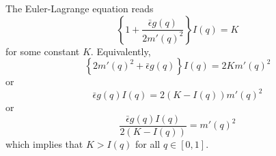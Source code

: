\documentclass[12pt]{article}
\begin{document}
The Euler-Lagrange equation reads
\begin{equation*}
\left\{1+\frac{\bar{\epsilon}g(q)}{2m'(q)^2}\right\}I(q)=K
\end{equation*}
for some constant $K$. Equivalently,
\begin{equation*}
\left\{2m'(q)^2+\bar{\epsilon}g(q)\right\}I(q)=2Km'(q)^2
\end{equation*}
or
\begin{equation*}
\bar{\epsilon}g(q)I(q)=2(K-I(q))m'(q)^2
\end{equation*}
or
\begin{equation*}
\frac{\bar{\epsilon}g(q)I(q)}{2(K-I(q))}=m'(q)^2
\end{equation*}
which implies that $K>I(q)$ for all $q\in[0,1]$. 
\end{document}
